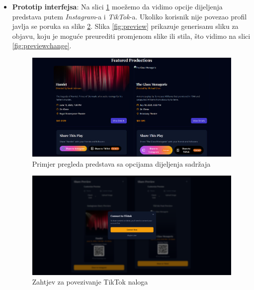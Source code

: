 \begin{itemize}  
    \item \textbf{Prototip interfejsa}: Na slici \ref{fig:shareplayoverview} moežemo da vidimo opcije dijeljenja predstava putem \textit{Instagram}-a i \textit{TikTok}-a. Ukoliko korisnik nije povezao profil javlja se poruka sa slike \ref{fig:connecttitktok}. Slika \ref{fig:preview} prikazuje generisanu sliku za objavu, koju je moguće preurediti promjenom slike ili stila, što vidimo na slici \ref{fig:previewchange}.

    \begin{figure}[H]
        \centering
        \includegraphics[width=\linewidth]{Slike/FZ5/shareplayoverview.png}
        \caption{Primjer pregleda predstava sa opcijama dijeljenja sadržaja}
        \label{fig:shareplayoverview}
    \end{figure}

    \begin{figure}[H]
        \centering
        \includegraphics[width=\linewidth]{Slike/FZ5/connecttiktok.png}
        \caption{Zahtjev za povezivanje TikTok naloga}
        \label{fig:connecttitktok}
    \end{figure}


\end{itemize}

